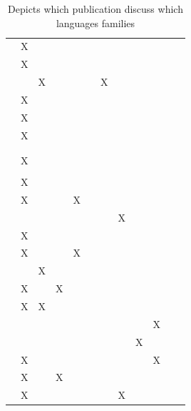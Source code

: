 \documentclass[11pt,a4paper]{book}
\theoremstyle{definition}
\theoremstyle{definition}
\theoremstyle{definition}
\theoremstyle{remark}
\begin{document}
\begin{table}
\begin{tabular}{lp{1cm}p{1cm}p{1cm}p{1cm}p{1cm}p{1cm}p{1.1cm}p{1cm}p{1cm}p{1cm}p{1cm}}
 \cite{weslake2015partial} 	& X	& 	& 	& 	& 	& 	& 	& 	& 	& 	\\
 \cite{chockler2015causal}  	& X	& 	& 	& 	& 	& 	& 	& 	& 	& 	\\
 \cite{beckers2016general} 	& 	& X	& 	& 	& 	& X	& 	& 	& 	& 	\\
 \cite{schaffer2016grounding}  	& X	& 	& 	& 	& 	& 	& 	& 	& 	& 	\\
 \cite{halpern2016appropriate} 	& X	& 	& 	& 	& 	& 	& 	& 	& 	& 	\\
 \cite{blanchard2017cause}  	& X	& 	& 	& 	& 	& 	& 	& 	& 	& 	\\
 \cite{wright2017ness}  	& 	& 	& 	& 	& 	& 	& 	& 	& 	& 	\\
 \cite{icard2017normality} 	& 	& 	& 	& 	& 	& 	& 	& 	& 	& 	\\
 \cite{aleksandrowicz2017computational}  	& X	& 	& 	& 	& 	& 	& 	& 	& 	& 	\\
 \cite{fenton2017proposed}  	& 	& 	& 	& 	& 	& 	& 	& 	& 	& 	\\
 \cite{lagnado2017causation}  	& X	& 	& 	& 	& 	& 	& 	& 	& 	& 	\\
 \cite{bochman2018actual}  	& X	& 	& 	& X	& 	& 	& 	& 	& 	& 	\\
 \cite{ibeling2018conditional}  	& 	& 	& 	& 	& 	& 	& X	& 	& 	& 	\\
 \cite{beckers2018principled} 	& X	& 	& 	& 	& 	& 	& 	& 	& 	& 	\\
 \cite{bochman2018laws}  	& X	& 	& 	& X	& 	& 	& 	& 	& 	& 	\\
 \cite{denecker2018causal}  	& 	& X	& 	& 	& 	& 	& 	& 	& 	& 	\\
 \cite{batusov2018situation}  	& X	& 	& X	& 	& 	& 	& 	& 	& 	& 	\\
 \cite{denecker2019explaining}  	& X	& X	& 	& 	& 	& 	& 	& 	& 	& 	\\
 \cite{liepicna2019evaluation}  	& 	& 	& 	& 	& 	& 	& 	& 	& X	& 	\\
 \cite{leblanc2019explaining} 	& 	& 	& 	& 	& 	& 	& 	& X	& 	& 	\\
 \cite{liepicna2020arguing} 	& X	& 	& 	& 	& 	& 	& 	& 	& X	& 	\\
 \cite{khannecessary}  	& X	& 	& X	& 	& 	& 	& 	& 	& 	& 	\\
 \cite{ibeling2020probabilistic}  	& X	& 	& 	& 	& 	& 	& X	& 	& 	& 	\\
\bottomrule
\end{tabular}
\caption{Depicts which publication discuss which languages families}
\label{tab:modelling-languages}
\end{table}
\end{document}
